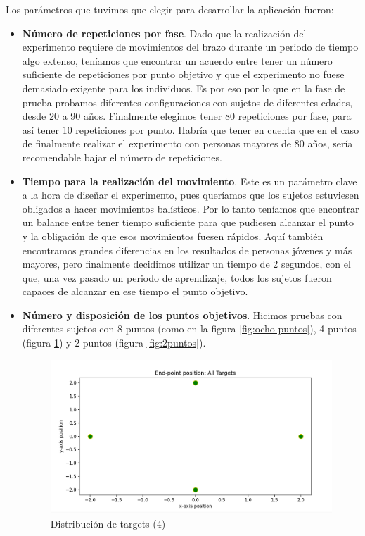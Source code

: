 \documentclass[a4paper,11pt, oneside]{book}
\begin{document}
Los parámetros que tuvimos que elegir para desarrollar la aplicación fueron:
\begin{itemize}
	\item \textbf{Número de repeticiones por fase}. Dado que la realización del experimento requiere de movimientos del brazo durante un periodo de tiempo algo extenso, teníamos que encontrar un acuerdo entre tener un número suficiente de repeticiones por punto objetivo y que el experimento no fuese demasiado exigente para los individuos. Es por eso por lo que en la fase de prueba probamos diferentes configuraciones con sujetos de diferentes edades, desde 20 a 90 años. Finalmente elegimos tener 80 repeticiones por fase, para así tener 10 repeticiones por punto. Habría que tener en cuenta que en el caso de finalmente realizar el experimento con personas mayores de 80 años, sería recomendable bajar el número de repeticiones.
	\item \textbf{Tiempo para la realización del movimiento}. Este es un parámetro clave a la hora de diseñar el experimento, pues queríamos que los sujetos estuviesen obligados a hacer movimientos balísticos. Por lo tanto teníamos que encontrar un balance entre tener tiempo suficiente para que pudiesen alcanzar el punto y la obligación de que esos movimientos fuesen rápidos. Aquí también encontramos grandes diferencias en los resultados de personas jóvenes y más mayores, pero finalmente decidimos utilizar un tiempo de 2 segundos, con el que, una vez pasado un periodo de aprendizaje, todos los sujetos fueron capaces de alcanzar en ese tiempo el punto objetivo.
	\item \textbf{Número y disposición de los puntos objetivos}. Hicimos pruebas con diferentes sujetos con 8 puntos (como en la figura \ref{fig:ocho-puntos}), 4 puntos (figura \ref{fig:4puntos}) y 2 puntos (figura \ref{fig:2puntos}).
	
		 \begin{figure}[H]
		
		\centering
		\includegraphics[width=0.7\linewidth]{points-4}
		\caption{Distribución de targets (4)}
		\label{fig:4puntos}	
	\end{figure}


\end{itemize}
\end{document}
